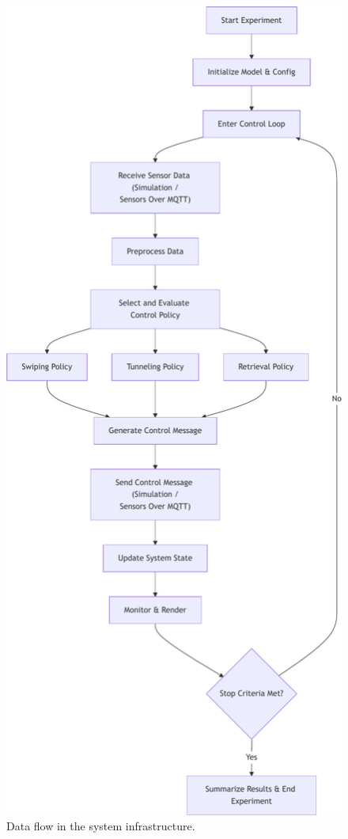 \begin{figure}
    \centering
    \includegraphics[height=\textheight]{figures/diagrams/control-flow}
    \caption{Data flow in the system infrastructure.}
    \label{fig:control-flow}
\end{figure}


